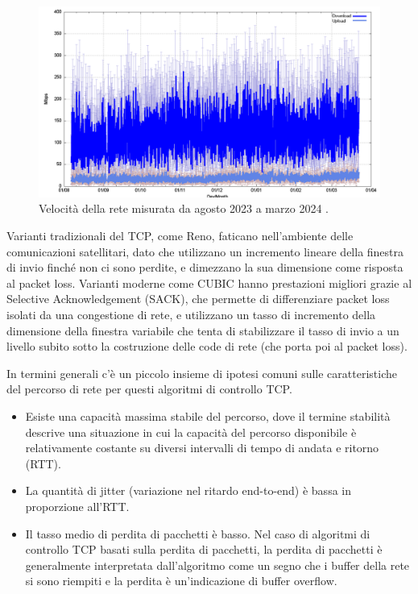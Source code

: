 \begin{figure}[htbp]
  \centering
  \includegraphics[width=0.8\linewidth]{./res/img/starlink_performance.png}
  \caption{Velocità della rete misurata da agosto 2023 a marzo 2024 \cite{tanveer_making_2023}.}
  \label{fig:starlink-performance}
\end{figure}

Varianti tradizionali del \ac{TCP}, come Reno, faticano nell'ambiente delle comunicazioni satellitari, dato che utilizzano un incremento lineare della finestra di invio finché non ci sono perdite, e dimezzano la sua dimensione come risposta al packet loss.
Varianti moderne come CUBIC hanno prestazioni migliori grazie al Selective Acknowledgement (SACK), che permette di differenziare packet loss isolati da una congestione di rete, e utilizzano un tasso di incremento della dimensione della finestra variabile che tenta di stabilizzare il tasso di invio a un livello subito sotto la costruzione delle code di rete (che porta poi al packet loss).

In termini generali c'è un piccolo insieme di ipotesi comuni sulle caratteristiche del percorso di rete per questi algoritmi di controllo TCP.
\begin{itemize}
  \item Esiste una capacità massima stabile del percorso, dove il termine stabilità descrive una situazione in cui la capacità del percorso disponibile è relativamente costante su diversi intervalli di tempo di andata e ritorno (RTT).
  \item La quantità di jitter (variazione nel ritardo end-to-end) è bassa in proporzione all'RTT.
  \item Il tasso medio di perdita di pacchetti è basso. Nel caso di algoritmi di controllo TCP basati sulla perdita di pacchetti, la perdita di pacchetti è generalmente interpretata dall'algoritmo come un segno che i buffer della rete si sono riempiti e la perdita è un'indicazione di buffer overflow.
\end{itemize}

